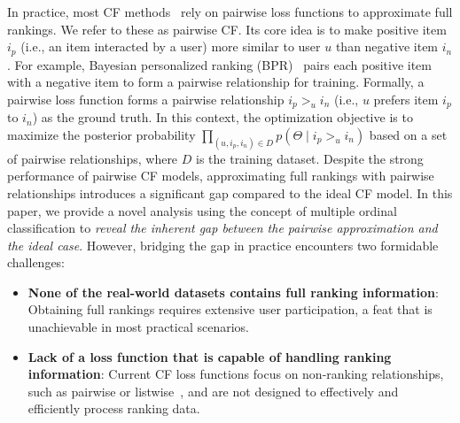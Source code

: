 In practice, most CF methods~\cite{HDW20,WWF21,YYX22} rely on pairwise loss functions to approximate full rankings. We refer to these as pairwise CF. Its core idea is to make positive item $i_p$ (i.e., an item interacted by a user) more similar to user $u$ than negative item $i_n$. For example, Bayesian personalized ranking (BPR)~\cite{RFG12} pairs each positive item with a negative item to form a pairwise relationship for training. Formally, a pairwise loss function forms a pairwise relationship $i_p >_{u} i_n$ (i.e., $u$ prefers item $i_p$ to $i_n$) as the ground truth. In this context, the optimization objective is to maximize the posterior probability $\prod_ {(u, i_p, i_n) \in D}p(\Theta \mid i_p>_{u} i_n)$ based on a set of pairwise relationships, where $D$ is the training dataset. Despite the strong performance of pairwise CF models, approximating full rankings with pairwise relationships introduces a significant gap compared to the ideal CF model. In this paper, we provide a novel analysis using the concept of multiple ordinal classification to \textit{reveal the inherent gap between the pairwise approximation and the ideal case}. However, bridging the gap in practice encounters two formidable challenges:
\begin{itemize}
    \item \textbf{None of the real-world datasets contains full ranking information}: Obtaining full rankings requires extensive user participation, a feat that is unachievable in most practical scenarios.
    \item \textbf{Lack of a loss function that is capable of handling ranking information}: Current CF loss functions focus on non-ranking relationships, such as pairwise or listwise~\cite{XLW08}, and are not designed to effectively and efficiently process ranking data.
\end{itemize}
